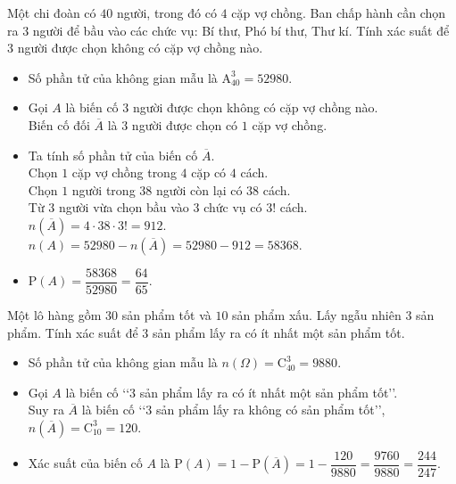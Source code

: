 \begin{vd}
	Một chi đoàn có $40$ người, trong đó có $4$ cặp vợ chồng. Ban chấp hành cần chọn ra $3$ người để bầu vào các chức vụ: Bí thư, Phó bí thư, Thư kí. Tính xác suất để 3 người được chọn không có cặp vợ chồng nào.
	\loigiai
	{
		\begin{itemize}
			\item Số phần tử của không gian mẫu là $\mathrm{A}_{40}^3=52980$.
			\item Gọi $A$ là biến cố $3$ người được chọn không có cặp vợ chồng nào.\\
			Biến cố đối $\overline{A}$ là $3$ người được chọn có $1$ cặp vợ chồng.
			\item Ta tính số phần tử của biến cố $\overline{A}$.\\
			Chọn $1$ cặp vợ chồng trong $4$ cặp có $4$ cách.\\
			Chọn $1$ người trong $38$ người còn lại có $38$ cách.\\
			Từ $3$ người vừa chọn bầu vào $3$ chức vụ có $3!$ cách.\\
			$n(\overline{A})=4\cdot 38 \cdot 3!=912$.\\
			$n(A)=52980-n(\overline{A})=52980-912=58368$.
			\item $\mathrm{P}(A)=\dfrac{58368}{52980}=\dfrac{64}{65}$.
		\end{itemize}
	}
\end{vd}
\begin{vd}
	Một lô hàng gồm $30$ sản phẩm tốt và $10$ sản phẩm xấu. Lấy ngẫu nhiên $3$ sản phẩm. Tính xác suất để $3$ sản phẩm lấy ra có ít nhất một sản phẩm tốt.
	\loigiai
	{
		\begin{itemize}
			\item Số phần tử của không gian mẫu là $n\left(\Omega\right)=\mathrm{C}_{40}^3=9880$.
			\item Gọi $A$ là biến cố \lq\lq  $3$ sản phẩm lấy ra có ít nhất một sản phẩm tốt\rq\rq.\\
			Suy ra $\overline{A}$ là biến cố \lq\lq  $3$ sản phẩm lấy ra không có sản phẩm tốt\rq\rq,  $n\left(\overline{A}\right)=\mathrm{C}_{10}^3=120$.
			\item Xác suất của biến cố $A$ là $\mathrm{P}(A)=1-\mathrm{P}(\overline{A})=1-\dfrac{120}{9880}=\dfrac{9760}{9880}=\dfrac{244}{247}$.
		\end{itemize}
	}
\end{vd}
